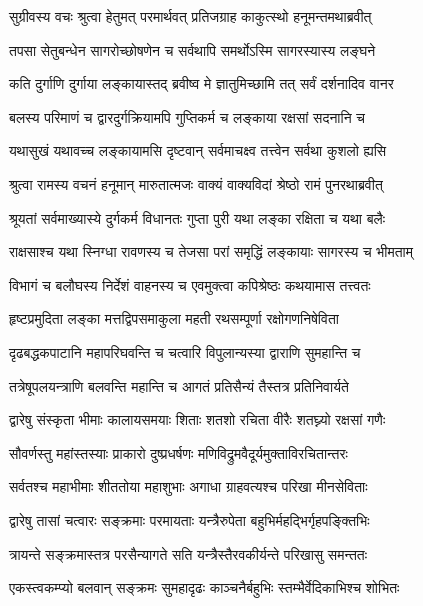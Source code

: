 
\twolineshloka
{सुग्रीवस्य वचः श्रुत्वा हेतुमत् परमार्थवत्}
{प्रतिजग्राह काकुत्स्थो हनूमन्तमथाब्रवीत्} %

\twolineshloka
{तपसा सेतुबन्धेन सागरोच्छोषणेन च}
{सर्वथापि समर्थोऽस्मि सागरस्यास्य लङ्घने} %

\twolineshloka
{कति दुर्गाणि दुर्गाया लङ्कायास्तद् ब्रवीष्व मे}
{ज्ञातुमिच्छामि तत् सर्वं दर्शनादिव वानर} %

\twolineshloka
{बलस्य परिमाणं च द्वारदुर्गक्रियामपि}
{गुप्तिकर्म च लङ्काया रक्षसां सदनानि च} %

\twolineshloka
{यथासुखं यथावच्च लङ्कायामसि दृष्टवान्}
{सर्वमाचक्ष्व तत्त्वेन सर्वथा कुशलो ह्यसि} %

\twolineshloka
{श्रुत्वा रामस्य वचनं हनूमान् मारुतात्मजः}
{वाक्यं वाक्यविदां श्रेष्ठो रामं पुनरथाब्रवीत्} %

\twolineshloka
{श्रूयतां सर्वमाख्यास्ये दुर्गकर्म विधानतः}
{गुप्ता पुरी यथा लङ्का रक्षिता च यथा बलैः} %

\twolineshloka
{राक्षसाश्च यथा स्निग्धा रावणस्य च तेजसा}
{परां समृद्धिं लङ्कायाः सागरस्य च भीमताम्} %

\twolineshloka
{विभागं च बलौघस्य निर्देशं वाहनस्य च}
{एवमुक्त्वा कपिश्रेष्ठः कथयामास तत्त्वतः} %

\twolineshloka
{हृष्टप्रमुदिता लङ्का मत्तद्विपसमाकुला}
{महती रथसम्पूर्णा रक्षोगणनिषेविता} %

\twolineshloka
{दृढबद्धकपाटानि महापरिघवन्ति च}
{चत्वारि विपुलान्यस्या द्वाराणि सुमहान्ति च} %

\twolineshloka
{तत्रेषूपलयन्त्राणि बलवन्ति महान्ति च}
{आगतं प्रतिसैन्यं तैस्तत्र प्रतिनिवार्यते} %

\twolineshloka
{द्वारेषु संस्कृता भीमाः कालायसमयाः शिताः}
{शतशो रचिता वीरैः शतघ्न्यो रक्षसां गणैः} %

\twolineshloka
{सौवर्णस्तु महांस्तस्याः प्राकारो दुष्प्रधर्षणः}
{मणिविद्रुमवैदूर्यमुक्ताविरचितान्तरः} %

\twolineshloka
{सर्वतश्च महाभीमाः शीततोया महाशुभाः}
{अगाधा ग्राहवत्यश्च परिखा मीनसेविताः} %

\twolineshloka
{द्वारेषु तासां चत्वारः सङ्क्रमाः परमायताः}
{यन्त्रैरुपेता बहुभिर्महद्भिर्गृहपङ्क्तिभिः} %

\twolineshloka
{त्रायन्ते सङ्क्रमास्तत्र परसैन्यागते सति}
{यन्त्रैस्तैरवकीर्यन्ते परिखासु समन्ततः} %

\twolineshloka
{एकस्त्वकम्प्यो बलवान् सङ्क्रमः सुमहादृढः}
{काञ्चनैर्बहुभिः स्तम्भैर्वेदिकाभिश्च शोभितः} %

